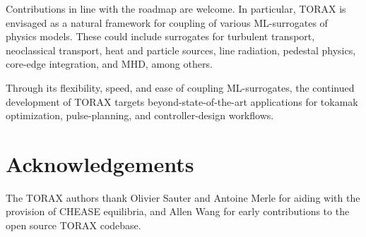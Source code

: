\documentclass[aps, reprint, nofootinbib]{revtex4-2}
\begin{document}
Contributions in line with the roadmap are welcome. In particular, TORAX is envisaged as a natural framework for coupling of various ML-surrogates of physics models. These could include surrogates for turbulent transport, neoclassical transport, heat and particle sources, line radiation, pedestal physics, core-edge integration, and MHD, among others.

Through its flexibility, speed, and ease of coupling ML-surrogates, the continued development of TORAX targets beyond-state-of-the-art applications for tokamak optimization, pulse-planning, and controller-design workflows.

\section{Acknowledgements}
The TORAX authors thank Olivier Sauter and Antoine Merle for aiding with the provision of CHEASE equilibria, and Allen Wang for early contributions to the open source TORAX codebase.

\newpage  %
\end{document}
